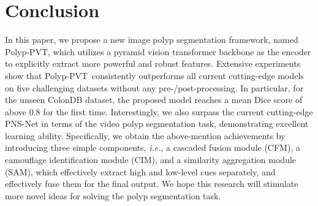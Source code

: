 \documentclass[journal]{IEEEtran}
\def\ourmodel{Polyp-PVT}
\begin{document}
\section{Conclusion}
In this paper, we propose a new image polyp segmentation framework, named \ourmodel, which utilizes a pyramid vision transformer backbone as the encoder to explicitly extract more powerful and robust features.
Extensive experiments show that \ourmodel~consistently outperforms all current cutting-edge models on five challenging datasets without any pre-/post-processing.
In particular, for the unseen ColonDB dataset, the proposed model reaches a mean Dice score of above 0.8 for the first time.
Interestingly, we also surpass the current cutting-edge PNS-Net in terms of the video polyp segmentation task, demonstrating excellent learning ability. 
Specifically, we obtain the above-mention achievements by introducing three simple components, \emph{i.e.}, a cascaded fusion module (CFM), a camouflage identification module (CIM), and a similarity aggregation module (SAM), which effectively extract high and low-level cues separately, and effectively fuse them for the final output. 
We hope this research will stimulate more novel ideas for solving the polyp segmentation task.
	

{


}
\end{document}
